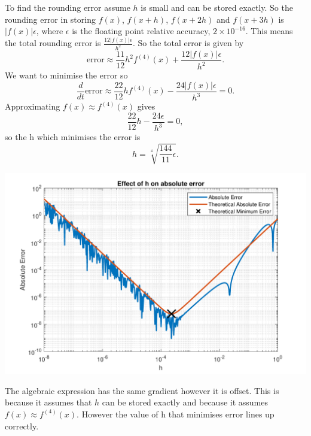 \documentclass[a4paper,11pt]{article}
\begin{document}
\begin{enumerate}
\begin{enumerate}
		To find the rounding error assume $h$ is small and can be stored 
		exactly. So the rounding error in storing $f(x)$, $f(x+h)$, $f(x+2h)$ 
		and $f(x+3h)$ is $|f(x)|\epsilon$, where $\epsilon$ is the floating 
		point relative accuracy, $2\times 10^{-16}$. This means the total 
		rounding error is $\frac{12|f(x)|\epsilon}{h^{2}}$. So the total 
		error is given by
		\begin{equation}
			\text{error} \approx \frac{11}{12}h^{2}f^{(4)}(x) + 
			\frac{12|f(x)|\epsilon}{h^{2}}.
		\end{equation}
		We want to minimise the error so
		\begin{equation}
			\frac{d}{dt}\text{error} \approx \frac{22}{12}hf^{(4)}(x) - 
			\frac{24|f(x)|\epsilon}{h^{3}}=0.
		\end{equation}
		Approximating $f(x)\approx f^{(4)}(x)$ gives
		\begin{equation}
			\frac{22}{12}h - 
			\frac{24\epsilon}{h^{3}}=0,
		\end{equation}
		so the h which minimises the error is
		\begin{equation}
			h = \sqrt[4]{\frac{144}{11}\epsilon}.
		\end{equation}
		\begin{center}
			\includegraphics[scale=0.7]{images/Q2bii.pdf}
		\end{center}
		The algebraic expression has the same gradient however it is offset. 
		This is because it assumes that $h$ can be stored exactly and because 
		it assumes $f(x)\approx f^{(4)}(x)$. However the value of h that 
		minimises error lines up correctly.
	\end{enumerate}
\end{enumerate}
\end{document}
